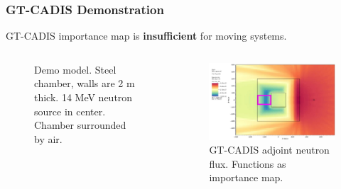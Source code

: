 \documentclass{beamer}
\begin{document}
\begin{frame}
\frametitle{GT-CADIS Demonstration}
	GT-CADIS importance map is \textbf{insufficient} for moving systems.

	\begin{columns}
        \begin{figure}
	\vspace{0.8cm}
		\hspace{-1cm}
		\vspace{-0.3cm}
	\caption{Demo model. Steel chamber, walls are 2 m thick.  14 MeV
		neutron source in center.  Chamber surrounded by air.}
        \end{figure}

        \begin{figure}
	\centering
	\includegraphics[scale=0.20]{gtcadis_adjn_hi.jpg}
		\caption{GT-CADIS adjoint neutron flux. Functions as importance
		map.}
	\end{figure}
	\end{columns}

\end{frame}
\end{document}
